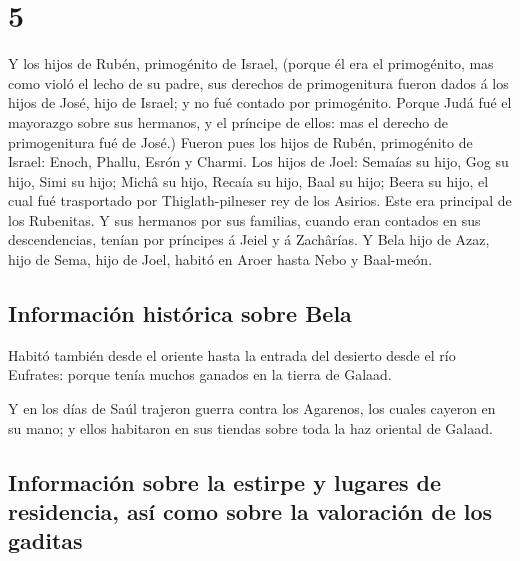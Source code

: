\hypertarget{section-13-5}{%
\section{5}\label{section-13-5}}

 Y los hijos de Rubén, primogénito de Israel, (porque él
era el primogénito, mas como violó el lecho de su padre, sus derechos de
primogenitura fueron dados á los hijos de José, hijo de Israel; y no fué
contado por primogénito.  Porque Judá fué el mayorazgo
sobre sus hermanos, y el príncipe de ellos: mas el derecho de
primogenitura fué de José.)  Fueron pues los hijos de
Rubén, primogénito de Israel: Enoch, Phallu, Esrón y Charmi.
 Los hijos de Joel: Semaías su hijo, Gog su hijo, Simi su
hijo;  Michâ su hijo, Recaía su hijo, Baal su hijo;
 Beera su hijo, el cual fué trasportado por
Thiglath-pilneser rey de los Asirios. Este era principal de los
Rubenitas.  Y sus hermanos por sus familias, cuando eran
contados en sus descendencias, tenían por príncipes á Jeiel y á
Zachârías.  Y Bela hijo de Azaz, hijo de Sema, hijo de
Joel, habitó en Aroer hasta Nebo y Baal-meón.

\hypertarget{informaciuxf3n-histuxf3rica-sobre-bela}{%
\subsection{Información histórica sobre
Bela}\label{informaciuxf3n-histuxf3rica-sobre-bela}}

 Habitó también desde el oriente hasta la entrada del
desierto desde el río Eufrates: porque tenía muchos ganados en la tierra
de Galaad.

 Y en los días de Saúl trajeron guerra contra los
Agarenos, los cuales cayeron en su mano; y ellos habitaron en sus
tiendas sobre toda la haz oriental de Galaad.

\hypertarget{informaciuxf3n-sobre-la-estirpe-y-lugares-de-residencia-asuxed-como-sobre-la-valoraciuxf3n-de-los-gaditas}{%
\subsection{Información sobre la estirpe y lugares de residencia, así
como sobre la valoración de los
gaditas}\label{informaciuxf3n-sobre-la-estirpe-y-lugares-de-residencia-asuxed-como-sobre-la-valoraciuxf3n-de-los-gaditas}}

